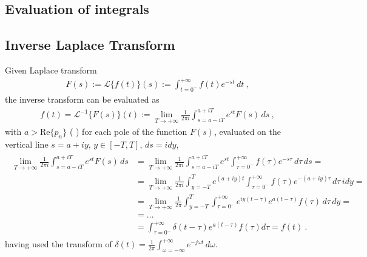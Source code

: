 \documentclass[letterpaper,10pt,english]{jupyterBook}
\begin{document}
\subsection{Evaluation of integrals}
\label{\detokenize{ch/complex/analysis:evaluation-of-integrals}}

\subsection{Inverse Laplace Transform}
\label{\detokenize{ch/complex/analysis:inverse-laplace-transform}}
\sphinxAtStartPar
Given Laplace transform
\begin{equation*}
\begin{split}F(s) := \mathscr{L}\{f(t)\}(s) := \int_{t=0^-}^{+\infty} f(t) e^{-st} \, dt \ ,\end{split}
\end{equation*}
\sphinxAtStartPar
the inverse transform can be evaluated as
\begin{equation*}
\begin{split}f(t) = \mathscr{L}^{-1}\{F(s)\}(t) := \lim_{T \rightarrow +\infty} \frac{1}{2 \pi i} \int_{s = a-iT}^{a+iT} e^{st} F(s) \, ds \ ,\end{split}
\end{equation*}
\sphinxAtStartPar
with \(a > \text{Re}\{p_n\}\) ( ) for each pole of the function \(F(s)\), evaluated on the vertical line \(s = a+iy\), \(y \in [-T,T]\), \(ds = i d y\),
\begin{equation*}
\begin{split}\begin{aligned}
  \lim_{T \rightarrow +\infty} \frac{1}{2 \pi i} \int_{s = a-iT}^{a+iT} e^{st} F(s) \, ds 
  & = \lim_{T \rightarrow +\infty} \frac{1}{2 \pi i} \int_{s = a-iT}^{a+iT} e^{st} \int_{\tau=0^-}^{+\infty} f(\tau) e^{-s\tau} \, d \tau  \, ds = \\
  & = \lim_{T \rightarrow +\infty} \frac{1}{2 \pi i} \int_{y = -T}^{T} e^{(a+iy)t} \int_{\tau=0^-}^{+\infty} f(\tau) e^{-(a+iy)\tau} \, d \tau  \, i dy = \\
  & = \lim_{T \rightarrow +\infty} \frac{1}{2 \pi} \int_{y = -T}^{T} \int_{\tau=0^-}^{+\infty} e^{iy(t-\tau)} e^{a(t-\tau)} f(\tau) \, d \tau  \, dy = \\
  & = \dots \\
  & = \int_{\tau=0^-}^{+\infty} \delta(t-\tau) e^{a(t-\tau)} f(\tau) d \tau = f(t) \ .
\end{aligned}\end{split}
\end{equation*}
\sphinxAtStartPar
having used the transform of {\hyperref[\detokenize{ch/functional-analysis/dirac-delta:functional-analysis-dirac-delta}]{}} \(\delta(t) = \frac{1}{2\pi} \int_{\omega=-\infty}^{+\infty} e^{-j \omega t} \, d\omega\).
\end{document}
